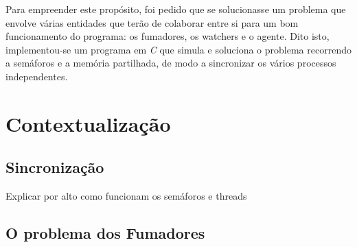 \documentclass[10pt,portuguese]{article}
\begin{document}
\par Para empreender este propósito, foi pedido que se solucionasse um problema que envolve várias entidades que terão de colaborar entre si para um bom funcionamento do programa: os fumadores, os watchers e o agente. Dito isto, implementou-se um programa em \textit{C} que simula e soluciona o problema recorrendo a semáforos e a memória partilhada, de modo a sincronizar os vários processos independentes. 
\clearpage

\section{Contextualização}

\subsection{Sincronização}

Explicar por alto como funcionam os semáforos e threads

\clearpage

\subsection{O problema dos Fumadores}
\end{document}
